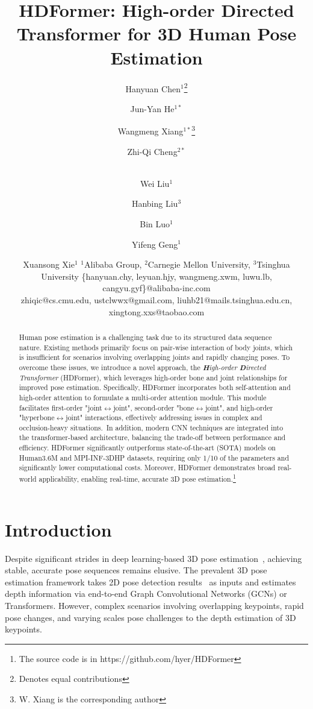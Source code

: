 \documentclass{article}
\title{HDFormer: High-order Directed Transformer for 3D Human Pose Estimation}
\author{
Hanyuan Chen$^{1}$\thanks{Denotes equal contributions}\and
Jun-Yan He$^{1*}$\and
Wangmeng Xiang$^{1*}$\thanks{W. Xiang is the corresponding author}\and
Zhi-Qi Cheng$^{2*}$\and \\
Wei Liu$^1$\and
Hanbing Liu$^3$\and
Bin Luo$^1$\and
Yifeng Geng$^1$\and
Xuansong Xie$^1$
\affiliations
$^1$Alibaba Group, \quad
$^2$Carnegie Mellon University, \quad
$^3$Tsinghua University
\emails
\{hanyuan.chy, leyuan.hjy, wangmeng.xwm, luwu.lb, cangyu.gyf\}@alibaba-inc.com \\
 zhiqic@cs.cmu.edu, ustclwwx@gmail.com, liuhb21@mails.tsinghua.edu.cn, xingtong.xxs@taobao.com 
 }
\begin{document}
\maketitle


\begin{abstract}
Human pose estimation is a challenging task due to its structured data sequence nature. Existing methods primarily focus on pair-wise interaction of body joints, which is insufficient for scenarios involving overlapping joints and rapidly changing poses. To overcome these issues, we introduce a novel approach, the \textit{\textbf{H}igh-order} \textit{\textbf{D}irected} \textit{Transformer} (HDFormer), which leverages high-order bone and joint relationships for improved pose estimation. Specifically, HDFormer incorporates both self-attention and high-order attention to formulate a multi-order attention module. This module facilitates first-order "joint$\leftrightarrow$joint", second-order "bone$\leftrightarrow$joint", and high-order "hyperbone$\leftrightarrow$joint" interactions, effectively addressing issues in complex and occlusion-heavy situations.~In addition, modern CNN techniques are integrated into the transformer-based architecture, balancing the trade-off between performance and efficiency. HDFormer significantly outperforms state-of-the-art (SOTA) models on Human3.6M and MPI-INF-3DHP datasets, requiring only 1/10 of the parameters and significantly lower computational costs. Moreover, HDFormer demonstrates broad real-world applicability, enabling real-time, accurate 3D pose estimation.\footnote{The source code is in https://github.com/hyer/HDFormer}
\end{abstract}





\section{Introduction}
Despite significant strides in deep learning-based 3D pose estimation~\cite{Iskakov_2019_ICCV,Qiu_2019_ICCV,pavllo2019-3d,li2020-cascaded,zhu2021-posegtac,2021PoseAug,ye2022-faster}, achieving stable, accurate pose sequences remains elusive. The prevalent 3D pose estimation framework takes 2D pose detection results~\cite{Chen2018CPN,SunXLW19} as inputs and estimates depth information via end-to-end Graph Convolutional Networks (GCNs)\cite{cai2019-exploiting,pavllo2019-3d} or Transformers\cite{ZhangCVPR22MixSTE}. However, complex scenarios involving overlapping keypoints, rapid pose changes, and varying scales pose challenges to the depth estimation of 3D keypoints.
\end{document}
